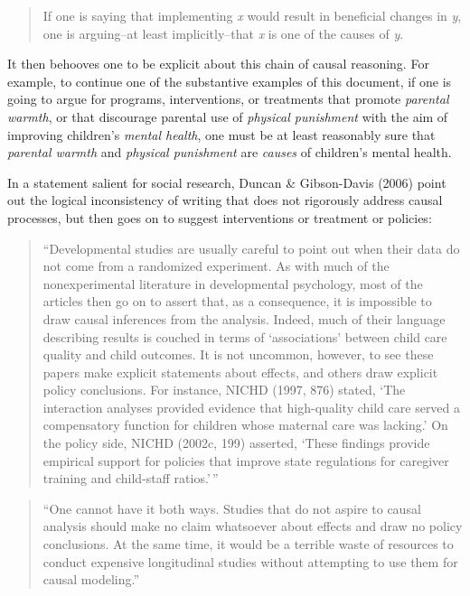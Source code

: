 \documentclass[
  letterpaper,
  DIV=11,
  numbers=noendperiod]{scrreprt}
\begin{document}
\begin{quote}
If one is saying that implementing \emph{x} would result in beneficial
changes in \emph{y}, one is arguing--at least implicitly--that \emph{x}
is one of the causes of \emph{y}.
\end{quote}

It then behooves one to be explicit about this chain of causal
reasoning. For example, to continue one of the substantive examples of
this document, if one is going to argue for programs, interventions, or
treatments that promote \emph{parental warmth}, or that discourage
parental use of \emph{physical punishment} with the aim of improving
children's \emph{mental health}, one must be at least reasonably sure
that \emph{parental warmth} and \emph{physical punishment} are
\emph{causes} of children's mental health.

In a statement salient for social research, Duncan \& Gibson-Davis
(2006) point out the logical inconsistency of writing that does not
rigorously address causal processes, but then goes on to suggest
interventions or treatment or policies:

\begin{quote}
``Developmental studies are usually careful to point out when their data
do not come from a randomized experiment. As with much of the
nonexperimental literature in developmental psychology, most of the
articles then go on to assert that, as a consequence, it is impossible
to draw causal inferences from the analysis. Indeed, much of their
language describing results is couched in terms of `associations'
between child care quality and child outcomes. It is not uncommon,
however, to see these papers make explicit statements about effects, and
others draw explicit policy conclusions. For instance, NICHD (1997, 876)
stated, `The interaction analyses provided evidence that high-quality
child care served a compensatory function for children whose maternal
care was lacking.' On the policy side, NICHD (2002c, 199) asserted,
`These findings provide empirical support for policies that improve
state regulations for caregiver training and child-staff ratios.'\,''
\end{quote}

\begin{quote}
``One cannot have it both ways. Studies that do not aspire to causal
analysis should make no claim whatsoever about effects and draw no
policy conclusions. At the same time, it would be a terrible waste of
resources to conduct expensive longitudinal studies without attempting
to use them for causal modeling.''
\end{quote}
\end{document}
